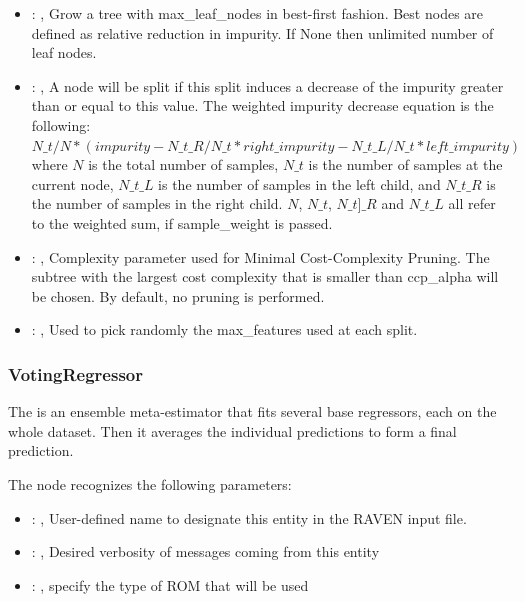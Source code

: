 \begin{itemize}
    \item {}: ,
      Grow a tree with max\_leaf\_nodes in best-first fashion. Best nodes are defined as relative
      reduction                                                  in impurity. If None then unlimited
      number of leaf nodes.

    \item {}: ,
      A node will be split if this split induces a decrease of the impurity greater than or equal to
      this value.                                                  The weighted impurity decrease
      equation is the following:                                                  $N\_t / N *
      (impurity - N\_t\_R / N\_t * right\_impurity - N\_t\_L / N\_t * left\_impurity)$
      where $N$ is the total number of samples, $N\_t$ is the number of samples at the current node,
      $N\_t\_L$ is the number                                                  of samples in the
      left child, and $N\_t\_R$ is the number of samples in the right child.
      $N$, $N\_t$, $N\_t]\_R$ and $N\_t\_L$ all refer to the weighted sum, if sample\_weight is
      passed.

    \item {}: ,
      Complexity parameter used for Minimal Cost-Complexity Pruning. The subtree with the largest
      cost                                                  complexity that is smaller than
      ccp\_alpha will be chosen. By default, no pruning is performed.

    \item {}: ,
      Used to pick randomly the max\_features used at each split.
  \end{itemize}


\subsubsection{VotingRegressor}
  The  is an ensemble meta-estimator that fits several base
  regressors, each on the whole dataset. Then it averages the individual predictions to form
  a final prediction.

  The  node recognizes the following parameters:
    \begin{itemize}
      \item {}: ,
        User-defined name to designate this entity in the RAVEN input file.
      \item {}: ,
        Desired verbosity of messages coming from this entity
      \item {}: ,
        specify the type of ROM that will be used
  \end{itemize}

